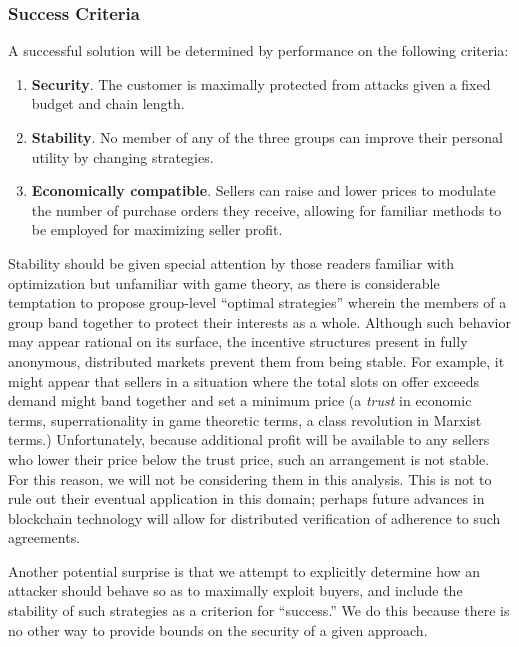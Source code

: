 \subsubsection{Success Criteria}

A successful solution will be determined by performance on the
following criteria:

\begin{enumerate}
\item \textbf{Security}. The customer is maximally protected from
  attacks given a fixed budget and chain length.
\item \textbf{Stability}. No member of any of the three groups can
  improve their personal utility by changing strategies.
\item \textbf{Economically compatible}. Sellers can raise and lower
  prices to modulate the number of purchase orders they receive,
  allowing for familiar methods to be employed for maximizing seller
  profit.
\end{enumerate}

Stability should be given special attention by those readers familiar
with optimization but unfamiliar with game theory, as there is
considerable temptation to propose group-level ``optimal strategies''
wherein the members of a group band together to protect their
interests as a whole. Although such behavior may appear rational on
its surface, the incentive structures present in fully anonymous,
distributed markets prevent them from being stable. For example, it
might appear that sellers in a situation where the total slots on
offer exceeds demand might band together and set a minimum price (a
\emph{trust} in economic terms, superrationality\cite{metamagic} in
game theoretic terms, a class revolution in Marxist terms.)
Unfortunately, because additional profit will be available to any
sellers who lower their price below the trust price, such an
arrangement is not stable. For this reason, we will not be considering
them in this analysis. This is not to rule out their eventual
application in this domain; perhaps future advances in blockchain
technology will allow for distributed verification of adherence to
such agreements.

Another potential surprise is that we attempt to explicitly determine
how an attacker should behave so as to maximally exploit buyers, and
include the stability of such strategies as a criterion for
``success.'' We do this because there is no other way to provide
bounds on the security of a given approach.

